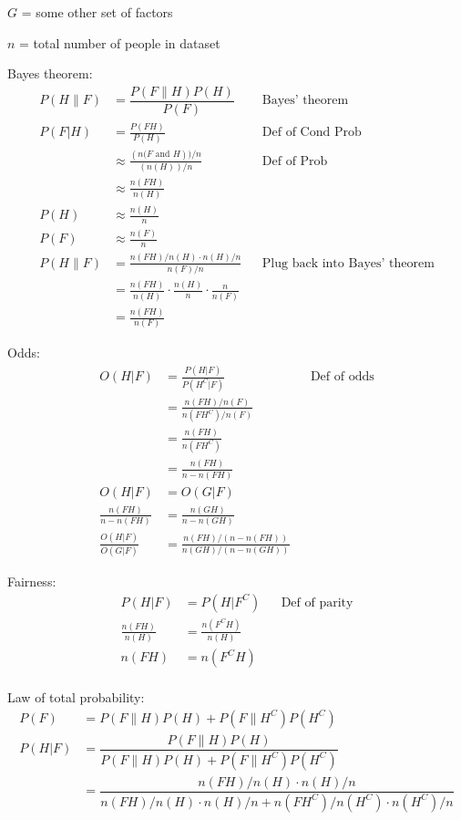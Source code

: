 \documentclass[11pt]{article}
\begin{document}
$G$ = some other set of factors

$n$ = total number of people in dataset

Bayes theorem:
\begin{align*}
    P(H\|F) &= \dfrac{P(F \| H) P(H)}{P(F)} && \text{Bayes' theorem} \\
    P(F|H) &= \frac{P(FH)}{P(H)} && \text{Def of Cond Prob} \\
    &\approx \frac{
    	(\text{$n(F$ and $H$})) / n
    }{
    	(\text{$n(H)$}) / n
    } && \text{Def of Prob} \\
    &\approx \frac{n(FH)}{n(H)} \\
    P(H) &\approx \frac{n(H)}{n} \\
    P(F) &\approx \frac{n(F)}{n} \\
    P(H\|F) &= \frac{n(FH)/n(H) \cdot n(H)/n}{n(F)/n} && \text{Plug back into Bayes' theorem} \\
    &= \frac{n(FH)}{n(H)} \cdot \frac{n(H)}{n} \cdot \frac{n}{n(F)}  \\
    &= \frac{n(FH)}{n(F)}
\end{align*}

Odds:
\begin{align*}
    O(H | F) &= \frac{P(H | F)}{P(H^C | F)} && \text{Def of odds} \\
    &= \frac{n(FH)/n(F)}{n(FH^C)/n(F)} \\
    &= \frac{n(FH)}{n(FH^C)} \\
    &= \frac{n(FH)}{n - n(FH)} \\
    O(H | F) &= O(G | F) \\
    \frac{n(FH)}{n - n(FH)} &= \frac{n(GH)}{n - n(GH)} \\
    \frac{O(H | F)}{O(G | F)} &= \frac{n(FH)/(n - n(FH))}{n(GH)/(n - n(GH))}
\end{align*}

Fairness:
\begin{align*}
    P(H | F) &= P(H | F^C) && \text{Def of parity}\\
    \frac{n(FH)}{n(H)} &= \frac{n(F^CH)}{n(H)} \\
    n(FH) &= n(F^CH) \\
\end{align*}

Law of total probability:
\begin{align*}
    P(F) &= P(F \| H) P(H) + P(F \| H^C) P(H^C) \\
    P(H | F) &= \dfrac{P(F \| H) P(H)}{P(F \| H) P(H) + P(F \| H^C) P(H^C)} \\
    &= \dfrac{n(FH)/n(H) \cdot n(H)/n}{n(FH)/n(H) \cdot n(H)/n + n(FH^C)/n(H^C) \cdot n(H^C)/n}
\end{align*}
\end{document}
